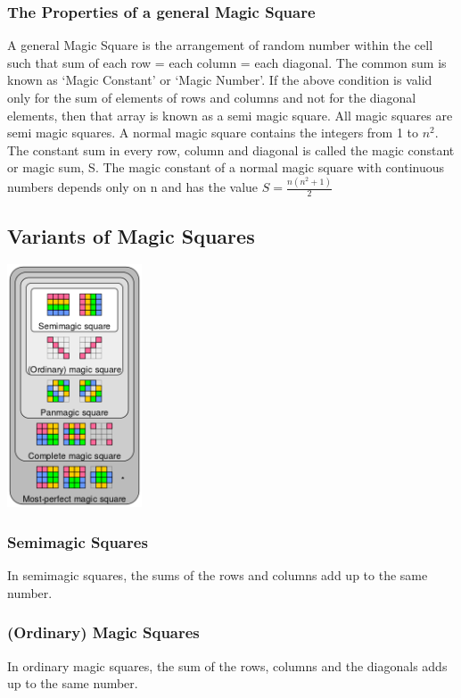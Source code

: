 \documentclass{article}
\begin{document}
\subsubsection{The Properties of a general Magic Square}
A general Magic Square is the arrangement of random number within the cell such that sum of each row = each column = each diagonal. The common sum is known as ‘Magic Constant’ or ‘Magic Number’. If the above condition is valid only for the sum of elements of rows and columns and not for the diagonal elements, then that array is known as a semi magic square. All magic squares are semi magic squares. A normal magic square contains the integers from 1 to $n^2$. The constant sum in every row, column and diagonal is called the magic constant or magic sum, S. The magic constant of a normal magic square with continuous numbers depends only on n and has the value $S = \frac{n(n^2+1)}{2}$

\subsection{Variants of Magic Squares}
\begin{center}
    \includegraphics[width=0.3\textwidth]{Photos/MagicSquareHeirarchy.png}
\end{center}
\subsubsection{Semimagic Squares}
    In semimagic squares, the sums of the rows and columns add up to the same number.
\subsubsection{(Ordinary) Magic Squares}
    In ordinary magic squares, the sum of the rows, columns and the diagonals adds up to the same number.
\end{document}
